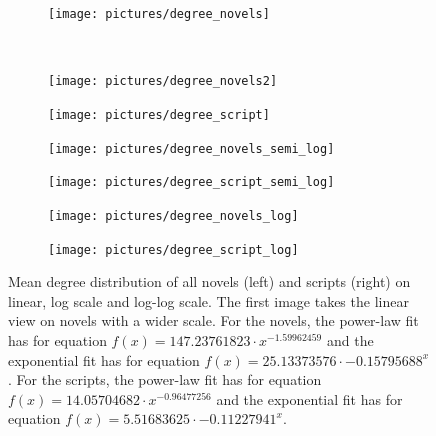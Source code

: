 \documentclass[a4paper, 12pt]{report}
\begin{document}
\begin{figure}
\begin{subfigure}{\textwidth}
\centering
\texttt{[image: pictures/degree\_novels]}
\end{subfigure}
\\
\begin{subfigure}{.45\textwidth}
\centering
\texttt{[image: pictures/degree\_novels2]}
\end{subfigure}
\hfill
\begin{subfigure}{.45\textwidth}
\centering
\texttt{[image: pictures/degree\_script]}
\end{subfigure}
\hfill
\begin{subfigure}{.45\textwidth}
\centering
\texttt{[image: pictures/degree\_novels\_semi\_log]}
\end{subfigure}
\hfill
\begin{subfigure}{.45\textwidth}
\centering
\texttt{[image: pictures/degree\_script\_semi\_log]}
\end{subfigure}
\hfill
\begin{subfigure}{.45\textwidth}
\centering
\texttt{[image: pictures/degree\_novels\_log]}
\end{subfigure}
\hfill
\begin{subfigure}{.45\textwidth}
\centering
\texttt{[image: pictures/degree\_script\_log]}
\end{subfigure}
\caption{Mean degree distribution of all novels (left) and scripts (right) on linear, log scale and log-log scale. The first image takes the linear view on novels with a wider scale. For the novels, the power-law fit has for equation $f(x) = 147.23761823 \cdot x^{-1.59962459}$ and the exponential fit has for equation $f(x) = 25.13373576 \cdot -0.15795688^x$. For the scripts, the power-law fit has for equation $f(x) = 14.05704682 \cdot x^{-0.96477256}$ and the exponential fit has for equation $f(x) = 5.51683625 \cdot -0.11227941^x$.}
\label{cumulated_degree_novel}
\end{figure}
\end{document}
